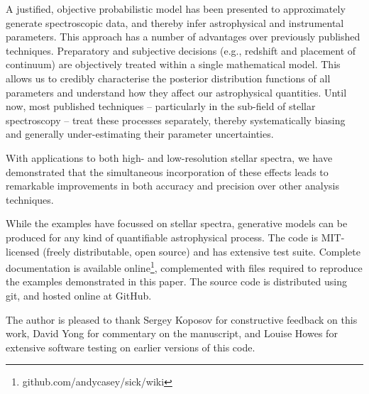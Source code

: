 \documentclass{aastex}
\begin{document}
A justified, objective probabilistic model has been presented to approximately generate spectroscopic data, and thereby infer astrophysical and instrumental parameters. This approach has a number of advantages over previously published techniques. Preparatory and subjective decisions (e.g., redshift and placement of continuum) are objectively treated within a single mathematical model. This allows us to credibly characterise the posterior distribution functions of all parameters and understand how they affect our astrophysical quantities. Until now, most published techniques -- particularly in the sub-field of stellar spectroscopy -- treat these processes separately, thereby systematically biasing and generally under-estimating their parameter uncertainties.

With applications to both high- and low-resolution stellar spectra, we have demonstrated that the simultaneous incorporation of these effects leads to remarkable improvements in both accuracy and precision over other analysis techniques.





While the examples have focussed on stellar spectra, generative models can be produced for any kind of quantifiable astrophysical process. The code is MIT-licensed (freely distributable, open source) and has extensive test suite. Complete documentation is available online\footnote{github.com/andycasey/sick/wiki}, complemented with files required to reproduce the examples demonstrated in this paper. The source code is distributed using git, and hosted online at GitHub. 

\acknowledgements
The author is pleased to thank Sergey Koposov for constructive feedback on this work, David Yong for commentary on the manuscript, and Louise Howes for extensive software testing on earlier versions of this code.
\end{document}
